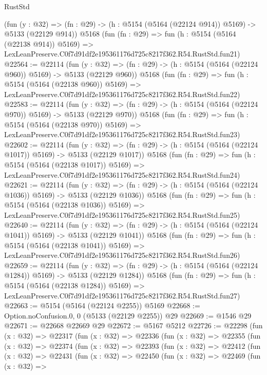 \begin{lexlean}{RustStd}
\begin{coremodule}
    (fun (y : @32) => (fn : @29) -> (h : @5154 (@5164 (@22124 @914)) @5169) -> @5133 (@22129 @914))
    @5168
    (fun (fn : @29) =>
    fun (h : @5154 (@5164 (@22138 @914)) @5169) =>
    LexLeanPreserve.C0f7d91df2e195361176d725c8217f362.R54.RustStd.fun21)
@22564 := @22114
    (fun (y : @32) => (fn : @29) -> (h : @5154 (@5164 (@22124 @960)) @5169) -> @5133 (@22129 @960))
    @5168
    (fun (fn : @29) =>
    fun (h : @5154 (@5164 (@22138 @960)) @5169) =>
    LexLeanPreserve.C0f7d91df2e195361176d725c8217f362.R54.RustStd.fun22)
@22583 := @22114
    (fun (y : @32) => (fn : @29) -> (h : @5154 (@5164 (@22124 @970)) @5169) -> @5133 (@22129 @970))
    @5168
    (fun (fn : @29) =>
    fun (h : @5154 (@5164 (@22138 @970)) @5169) =>
    LexLeanPreserve.C0f7d91df2e195361176d725c8217f362.R54.RustStd.fun23)
@22602 := @22114
    (fun (y : @32) =>
    (fn : @29) -> (h : @5154 (@5164 (@22124 @1017)) @5169) -> @5133 (@22129 @1017))
    @5168
    (fun (fn : @29) =>
    fun (h : @5154 (@5164 (@22138 @1017)) @5169) =>
    LexLeanPreserve.C0f7d91df2e195361176d725c8217f362.R54.RustStd.fun24)
@22621 := @22114
    (fun (y : @32) =>
    (fn : @29) -> (h : @5154 (@5164 (@22124 @1036)) @5169) -> @5133 (@22129 @1036))
    @5168
    (fun (fn : @29) =>
    fun (h : @5154 (@5164 (@22138 @1036)) @5169) =>
    LexLeanPreserve.C0f7d91df2e195361176d725c8217f362.R54.RustStd.fun25)
@22640 := @22114
    (fun (y : @32) =>
    (fn : @29) -> (h : @5154 (@5164 (@22124 @1041)) @5169) -> @5133 (@22129 @1041))
    @5168
    (fun (fn : @29) =>
    fun (h : @5154 (@5164 (@22138 @1041)) @5169) =>
    LexLeanPreserve.C0f7d91df2e195361176d725c8217f362.R54.RustStd.fun26)
@22659 := @22114
    (fun (y : @32) =>
    (fn : @29) -> (h : @5154 (@5164 (@22124 @1284)) @5169) -> @5133 (@22129 @1284))
    @5168
    (fun (fn : @29) =>
    fun (h : @5154 (@5164 (@22138 @1284)) @5169) =>
    LexLeanPreserve.C0f7d91df2e195361176d725c8217f362.R54.RustStd.fun27)
@22663 := @5154 (@5164 (@22124 @2255)) @5169
@22668 := Option.noConfusion.{0, 0} (@5133 (@22129 @2255)) @29
@22669 := @1546 @29
@22671 := @22668 @22669 @29
@22672 := @5167 @5212
@22726 := @22298
    (fun (x : @32) =>
    @22317
      (fun (x : @32) =>
      @22336
        (fun (x : @32) =>
        @22355
          (fun (x : @32) =>
          @22374
            (fun (x : @32) =>
            @22393
              (fun (x : @32) =>
              @22412
                (fun (x : @32) =>
                @22431
                  (fun (x : @32) =>
                  @22450
                    (fun (x : @32) =>
                    @22469
                      (fun (x : @32) =>

\end{coremodule}
\end{lexlean}
